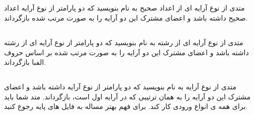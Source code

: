     \subsection{\grayBox{\textcolor{purple}{C\#}}\grayBox{\textcolor{orange}{Python}}\grayBox{\textcolor{red}{C++}}\grayBox{\textcolor{green}{Java}}}
       متدی از نوع
       آرایه ای از اعداد صحبح
       به نام
        بنویسید که دو پارامتر از نوع
         آرایه اعداد صحیح 
          داشته باشد و اعضای مشترک این دو آرایه را
          به صورت مرتب شده
          بازگرداند. 
 
     \subsection{\grayBox{\textcolor{purple}{C\#}}\grayBox{\textcolor{orange}{Python}}\grayBox{\textcolor{red}{C++}}\grayBox{\textcolor{green}{Java}}}
           متدی از نوع
           آرایه ای از رشته
           به نام
            بنویسید که دو پارامتر از نوع
             آرایه ای از رشته 
              داشته باشد و اعضای مشترک این دو آرایه را
              به صورت مرتب شده
              بر اساس حروف الفبا
              بازگرداند. 
    \subsection{\grayBox{\textcolor{purple}{C\#}}\grayBox{\textcolor{orange}{Python}}\grayBox{\textcolor{red}{C++}}\grayBox{\textcolor{green}{Java}}}
       متدی از نوع
       آرایه
       به نام
        بنویسید که دو پارامتر از نوع
        آرایه         
        داشته باشد و اعضای مشترک این دو آرایه را
        به همان ترتیبی که در آرایه اول است،
        بازگرداند. 
    متد شما باید برای همه ی انواع ورودی کار کند.
    برای فهم بهتر مساله به فایل های پایه رجوع کنید.
     
\LTR